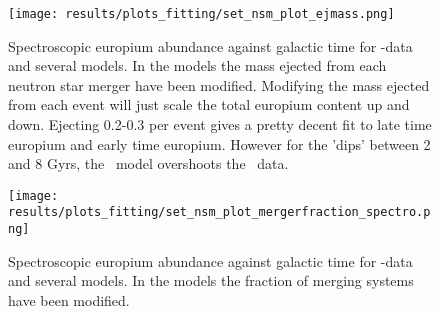 \begin{figure}[h]
  \begin{minipage}[t][][t]{0.4\textwidth}
    \centering
    \texttt{[image: results/plots\_fitting/set\_nsm\_plot\_ejmass.png]}
    \caption[\todo NSM-ejectamass]{
      \label{fig:fit-v3-ejecta}
      Spectroscopic europium abundance against galactic time for \eris-data and several \omegamodel models.
      In the models the mass ejected from each neutron star merger have been modified.
      Modifying the mass ejected from each event will just scale the total europium content up and down.
      Ejecting 0.2-0.3 \msol per event gives a pretty decent fit to late time europium and early time europium.
      However for the 'dips' between 2 and 8 Gyrs, the \omegamodel\ model overshoots the \eris\ data.
    }
  \end{minipage}
  \hfill
  \begin{minipage}[t][][t]{0.4\textwidth}
    \centering
    \texttt{[image: results/plots\_fitting/set\_nsm\_plot\_mergerfraction\_spectro.png]}
    \caption[\todo mergerfraction spectroscopic plot]{
      \label{fig:fit-v3-mergerfrac-euro}
      Spectroscopic europium abundance against galactic time for \eris-data and several \omegamodel models.
      In the models the fraction of merging systems have been modified.
    }
  \end{minipage}
\end{figure}
